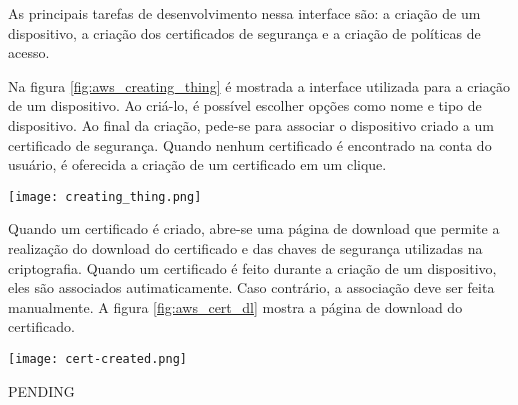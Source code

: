 As principais tarefas de desenvolvimento nessa interface são: a criação de um
dispositivo, a criação dos certificados de segurança e a criação de políticas de
acesso.

Na figura \ref{fig:aws_creating_thing} é mostrada a interface utilizada para a
criação de um dispositivo. Ao criá-lo, é possível escolher opções como nome
e tipo de dispositivo. Ao final da criação, pede-se para associar o dispositivo
criado a um certificado de segurança. Quando nenhum certificado é encontrado na
conta do usuário, é oferecida a criação de um certificado em um clique.

\begin{center}
	\centering 
	\texttt{[image: creating\_thing.png]}
	\label{fig:aws_creating_thing}
\end{center} 

Quando um certificado é criado, abre-se uma página de download que permite a
realização do download do certificado e das chaves de segurança utilizadas na
criptografia. Quando um certificado é feito durante a criação de um dispositivo,
eles são associados autimaticamente. Caso contrário, a associação deve ser feita
manualmente. A figura \ref{fig:aws_cert_dl} mostra a página de download do
certificado.

\begin{center}
	\centering 
	\texttt{[image: cert-created.png]}
	\label{fig:aws_cert_dl}
\end{center} 



PENDING


